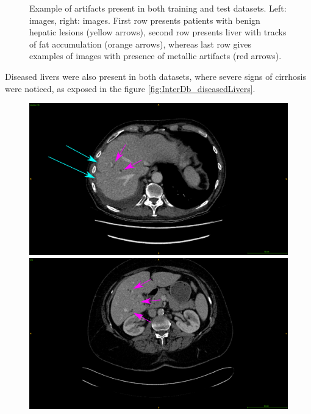 {\begin{figure}[!ht]
\begin{mdframed}[backgroundcolor=blue!50,linecolor=blue!50]
\begin{minipage}{0.45\linewidth}
		\end{minipage}
	\end{mdframed}
	\caption{Example of artifacts present in both training and test datasets. Left: \textbf{} images, right: \textbf{} images. First row presents patients with benign hepatic lesions (yellow arrows), second row presents liver with tracks of fat accumulation (orange arrows), whereas last row gives examples of images with presence of metallic artifacts (red arrows).}
	\label{fig:InterDb_artifacts}
\end{figure}
Diseased livers were also present in both datasets, where severe signs of cirrhosis were noticed, as exposed in the figure \ref{fig:InterDb_diseasedLivers}.
\begin{figure}[!ht]
	\begin{mdframed}[backgroundcolor=blue!50,linecolor=blue!50]
		\centering
		\begin{minipage}{0.45\linewidth}
			\includegraphics[width=\linewidth]{images/LITS_cirrhoticPatientArrows}
		\end{minipage} \hspace{-0.1cm}
		\begin{minipage}{0.45\linewidth}
			\includegraphics[width=\linewidth]{images/TCIA_cirrhoticPatientArrows}

\end{minipage}
\end{mdframed}
\end{figure}}
